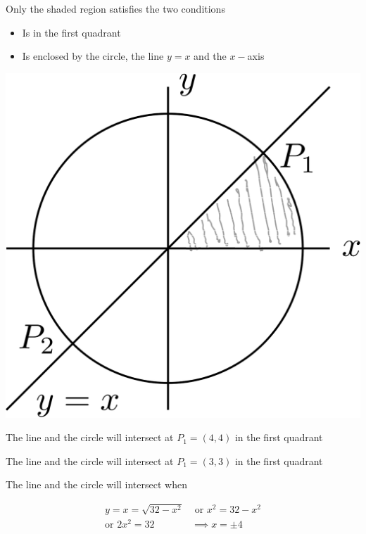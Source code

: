 \documentclass[14pt,fleqn]{extarticle}
\newcommand\ysq{32-x^2}
\newcommand\ycirc{\sqrt{\ysq}}
\begin{document}
\newcard

Only the shaded region satisfies the two conditions

\begin{itemize}
\item{Is in the first quadrant} 
\item{Is enclosed by the circle, the line $y=x$ and the $x-$axis} 
\end{itemize} 

\begin{center}
\includegraphics[scale=0.3]{figure.svg}
\end{center}

\newcard

The line and the circle will intersect at $P_1 = (4,4)$ in the first quadrant 
        
\newcard 

The line and the circle will intersect at $P_1 = (3,3)$ in the first quadrant 

\newcard 

The line and the circle will intersect when 

\begin{align}
	y = x = \ycirc &\text{ or } x^2 = \ysq \\
	\text{or } 2x^2 = 32 &\implies x = \pm 4 
\end{align}
\end{document}
